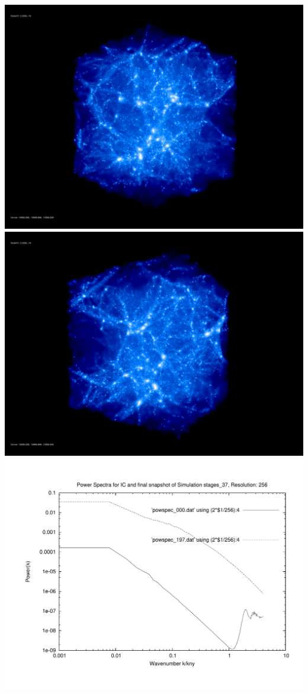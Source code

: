 \includegraphics[scale=0.1]{r256/h100/stages_37/rotate_00074.jpg} 
\includegraphics[scale=0.1]{r256/h100/stages_37/rotate_00131.jpg}  \\

\includegraphics[scale=0.5]{r256/h100/stages_37/plot_powspec_stages_37}


